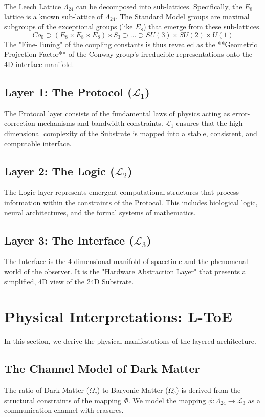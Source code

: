 \documentclass[11pt,titlepage]{article}
\newcommand{\protocol}{\mathcal{L}_1}
\newcommand{\logic}{\mathcal{L}_2}
\newcommand{\interface}{\mathcal{L}_3}
\newcommand{\leech}{\Lambda_{24}}
\begin{document}
The Leech Lattice $\leech$ can be decomposed into sub-lattices. Specifically, the $E_8$ lattice is a known sub-lattice of $\leech$. The Standard Model groups are maximal subgroups of the exceptional groups (like $E_8$) that emerge from these sub-lattices. 
\begin{equation}
Co_0 \supset (E_8 \times E_8 \times E_8) \rtimes S_3 \supset \dots \supset SU(3) \times SU(2) \times U(1)
\end{equation}
The "Fine-Tuning" of the coupling constants is thus revealed as the **Geometric Projection Factor** of the Conway group's irreducible representations onto the 4D interface manifold.

\subsection{Layer 1: The Protocol ($\protocol$)}
The Protocol layer consists of the fundamental laws of physics acting as error-correction mechanisms and bandwidth constraints. $\protocol$ ensures that the high-dimensional complexity of the Substrate is mapped into a stable, consistent, and computable interface. 

\subsection{Layer 2: The Logic ($\logic$)}
The Logic layer represents emergent computational structures that process information within the constraints of the Protocol. This includes biological logic, neural architectures, and the formal systems of mathematics.

\subsection{Layer 3: The Interface ($\interface$)}
The Interface is the 4-dimensional manifold of spacetime and the phenomenal world of the observer. It is the "Hardware Abstraction Layer" that presents a simplified, 4D view of the 24D Substrate.


\section{Physical Interpretations: L-ToE}
\label{sec:ltoe}
In this section, we derive the physical manifestations of the layered architecture.

\subsection{The Channel Model of Dark Matter}
The ratio of Dark Matter ($\Omega_c$) to Baryonic Matter ($\Omega_b$) is derived from the structural constraints of the mapping $\Phi$. We model the mapping $\phi: \leech \to \interface$ as a communication channel with erasures.
\end{document}
